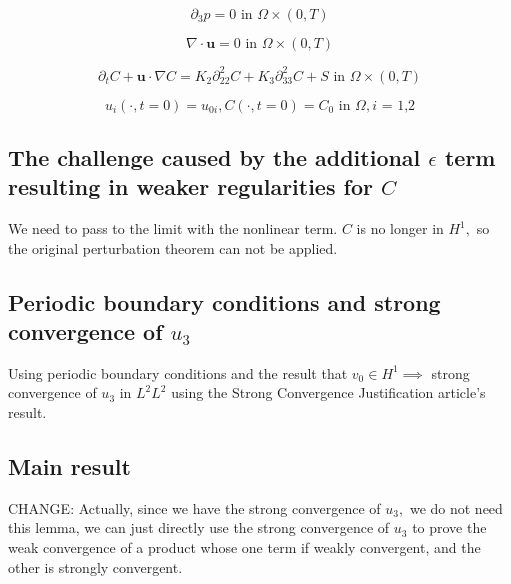 \documentclass[11pt]{article}
\begin{document}
    \begin{equation} \label{HNSC3}   
    \partial_3 p = 0 \text{ in } \Omega \times (0,T)
    \end{equation}
    
    \begin{equation} \label{HNSC4}   
    \nabla \cdot \mathbf{u} = 0 \text{ in } \Omega \times (0,T)
    \end{equation}
    
    \begin{equation} \label{HNSC5}   
    \partial_t C + \mathbf{u} \cdot \nabla C = K_2 \partial_{22} ^ 2 C + K_3 \partial_{33} ^2 C + S \text{ in } \Omega \times (0,T)
    \end{equation}
    
    \begin{equation} \label{HNSC7}   
    u_i (\cdot, t=0) = u_{0 i}, C (\cdot, t=0) = C_0 \text{ in } \Omega, \text{$i$ = 1,2}
    \end{equation}
 
  
  \subsection{The challenge caused by the additional $\epsilon$ term resulting in weaker regularities for $C$}
  
  We need to pass to the limit with the nonlinear term. $C$ is no longer in $H^1,$ so the original perturbation theorem can not be applied.
  
  \subsection{Periodic boundary conditions and strong convergence of $u_3$}
  
  Using periodic boundary conditions and the result that $v_0 \in H^1 \implies$ strong convergence of $u_3$ in $L^2 L^2$ using the Strong Convergence Justification article's result.
  
  \subsection{Main result}
  
  CHANGE: Actually, since we have the strong convergence of $u_3,$ we do not need this lemma, we can just directly use the strong convergence of $u_3$ to prove the weak convergence of a product whose one term if weakly convergent, and the other is strongly convergent.
  
\end{document}
